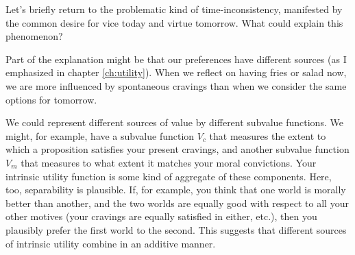 Let's briefly return to the problematic kind of time-inconsistency, manifested
by the common desire for vice today and virtue tomorrow. What could explain this phenomenon?

Part of the explanation might be that our preferences have different sources (as
I emphasized in chapter \ref{ch:utility}). When we reflect on having fries or
salad now, we are more influenced by spontaneous cravings than when we consider
the same options for tomorrow.

We could represent different sources of value by different subvalue functions.
We might, for example, have a subvalue function $V_{c}$ that measures the extent
to which a proposition satisfies your present cravings, and another subvalue
function $V_{m}$ that measures to what extent it matches your moral convictions.
Your intrinsic utility function is some kind of aggregate of these components.
Here, too, separability is plausible. If, for example, you think that one world
is morally better than another, and the two worlds are equally good with respect
to all your other motives (your cravings are equally satisfied in either, etc.),
then you plausibly prefer the first world to the second. This suggests that
different sources of intrinsic utility combine in an additive manner.


